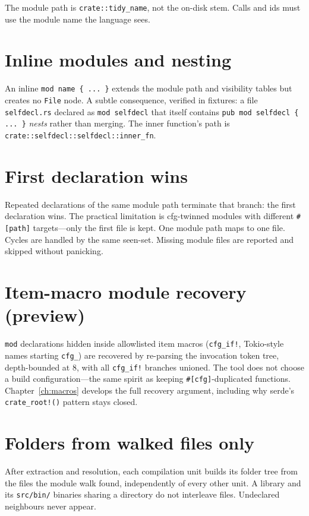 \documentclass[11pt,a4paper,oneside]{report}
\begin{document}
The module path is \texttt{crate::tidy\_name}, not the on-disk stem. Calls and
ids must use the module name the language sees.

\section{Inline modules and nesting}

An inline \texttt{mod name \{ ... \}} extends the module path and visibility
tables but creates no \texttt{File} node. A subtle consequence, verified in
fixtures: a file \texttt{selfdecl.rs} declared as \texttt{mod selfdecl} that
itself contains \texttt{pub mod selfdecl \{ ... \}} \emph{nests} rather than
merging. The inner function's path is
\texttt{crate::selfdecl::selfdecl::inner\_fn}.

\section{First declaration wins}

Repeated declarations of the same module path terminate that branch: the first
declaration wins. The practical limitation is cfg-twinned modules with
different \texttt{\#[path]} targets---only the first file is kept. One module
path maps to one file. Cycles are handled by the same seen-set. Missing module
files are reported and skipped without panicking.

\section{Item-macro module recovery (preview)}

\texttt{mod} declarations hidden inside allowlisted item macros
(\texttt{cfg\_if!}, Tokio-style names starting \texttt{cfg\_}) are recovered
by re-parsing the invocation token tree, depth-bounded at 8, with all
\texttt{cfg\_if!} branches unioned. The tool does not choose a build
configuration---the same spirit as keeping \texttt{\#[cfg]}-duplicated
functions. Chapter~\ref{ch:macros} develops the full recovery argument,
including why serde's \texttt{crate\_root!()} pattern stays closed.

\section{Folders from walked files only}

After extraction and resolution, each compilation unit builds its folder tree
from the files the module walk found, independently of every other unit. A
library and its \texttt{src/bin/} binaries sharing a directory do not
interleave files. Undeclared neighbours never appear.
\end{document}
